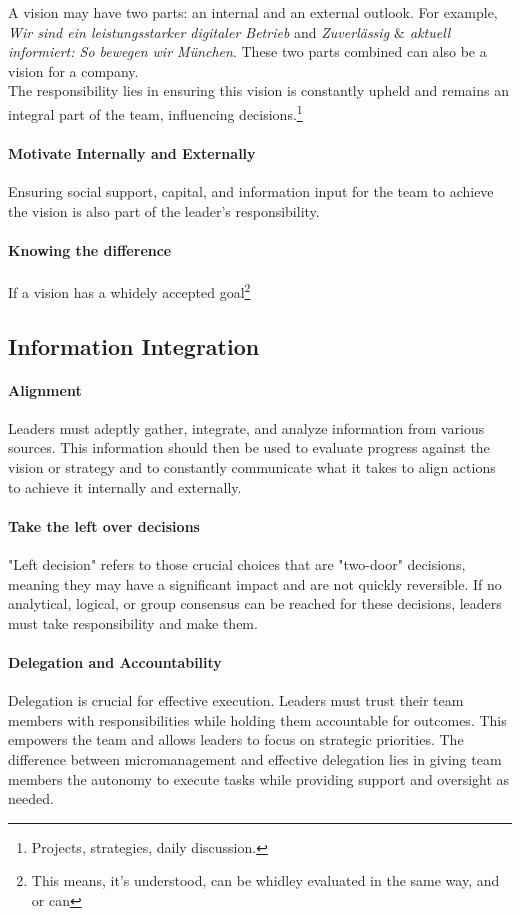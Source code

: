 A vision may have two parts: an internal and an external outlook. For example, \textit{Wir sind ein leistungsstarker digitaler Betrieb} and \textit{Zuverlässig $\&$ aktuell informiert: So bewegen wir München}. These two parts combined can also be a vision for a company.\\

The responsibility lies in ensuring this vision is constantly upheld and remains an integral part of the team, influencing decisions.\footnote{
	Projects, strategies, daily discussion.
}


\paragraph{Motivate Internally and Externally}
Ensuring social support, capital, and information input for the team to achieve the vision is also part of the leader's responsibility.

\paragraph{Knowing the difference}
If a vision has a whidely accepted goal\footnote{
	This means, it's understood, can be whidley evaluated in the same way, and or can 
}

\subsection{Information Integration}
\paragraph{Alignment}
Leaders must adeptly gather, integrate, and analyze information from various sources. This information should then be used to evaluate progress against the vision or strategy and to constantly communicate what it takes to align actions to achieve it internally and externally.

\paragraph{Take the left over decisions}
"Left decision" refers to those crucial choices that are "two-door" decisions, meaning they may have a significant impact and are not quickly reversible. If no analytical, logical, or group consensus can be reached for these decisions, leaders must take responsibility and make them.

\paragraph{Delegation and Accountability}
Delegation is crucial for effective execution. Leaders must trust their team members with responsibilities while holding them accountable for outcomes. This empowers the team and allows leaders to focus on strategic priorities. The difference between micromanagement and effective delegation lies in giving team members the autonomy to execute tasks while providing support and oversight as needed.



